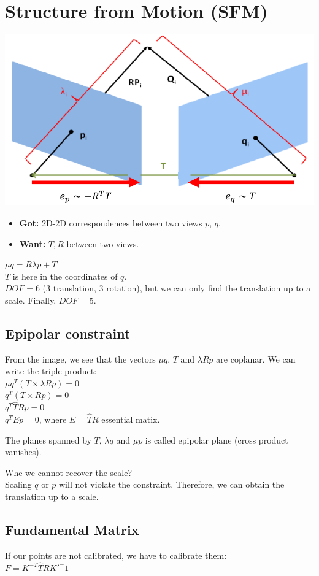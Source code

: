 \section{Structure from Motion (SFM)}
\includegraphics[width=\linewidth]{Images/SFM.png}
\begin{itemize}
  \item \textbf{Got:} 2D-2D correspondences between two views $p$, $q$.
  \item \textbf{Want:} $T, R$ between two views.
\end{itemize}
$\mu q = R \lambda p + T$\\
$T$ is here in the coordinates of $q$.\\
$DOF = 6$ (3 translation, 3 rotation), but 
we can only find the translation up to a scale. Finally, $DOF = 5$.

\subsection*{Epipolar constraint}
From the image, we see that the vectors $\mu q$, $T$ and $\lambda R p$
are coplanar. We can write the triple product:\\
$\mu q^T ( T \times \lambda R p) = 0$\\
$q^T ( T \times R p) = 0$\\
$q^T \hat{T} R p = 0$\\
$q^T E p = 0$, where $E = \hat{T} R$ essential matix.

The planes spanned by $T$, $\lambda q$ and $\mu p$ is called epipolar
plane (cross product vanishes).

\alert{Whe we cannot recover the scale?}\\
Scaling $q$ or $p$ will not violate the
constraint. Therefore, we can obtain the translation up to a scale.
\subsection*{Fundamental Matrix}
If our points are not calibrated, we have to calibrate them:\\
$F = K^{-T} \hat{T} R K'^-1$

